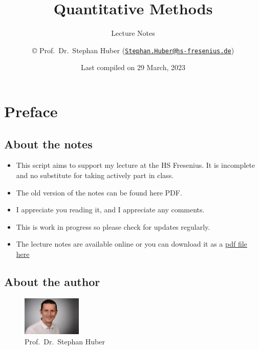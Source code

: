 \documentclass[
  12pt,
  oneside]{book}
\title{Quantitative Methods}
\subtitle{Lecture Notes}
\author{© Prof.~Dr.~Stephan Huber (\href{mailto:Stephan.Huber@hs-fresenius.de}{\nolinkurl{Stephan.Huber@hs-fresenius.de}})}
\date{Last compiled on 29 March, 2023}
\providecommand{\tightlist}{%
  \setlength{\itemsep}{0pt}\setlength{\parskip}{0pt}}
\theoremstyle{definition}
\theoremstyle{definition}
\theoremstyle{definition}
\theoremstyle{definition}
\theoremstyle{remark}
\begin{document}
\maketitle

{
\hypersetup{linkcolor=}
\setcounter{tocdepth}{2}
\tableofcontents
}
\hypertarget{preface}{%
\chapter*{Preface}\label{preface}}

\hypertarget{about-the-notes}{%
\section*{About the notes}\label{about-the-notes}}

\begin{itemize}
\tightlist
\item
  This script aims to support my lecture at the HS Fresenius. It is incomplete and no substitute for taking actively part in class.
\item
  The old version of the notes can be found here PDF.
\item
  I appreciate you reading it, and I appreciate any comments.
\item
  This is work in progress so please check for updates regularly.
\item
  The lecture notes are available online or you can download it as a \href{https://raw.githubusercontent.com/hubchev/hubchev.github.io/main/qm/_main.pdf}{pdf file here}
\end{itemize}

\hypertarget{about-the-author}{%
\section*{About the author}\label{about-the-author}}

\begin{figure}
\centering
\includegraphics[width=0.25\textwidth,height=\textheight]{fig/huber2.jpeg}
\caption[\label{fig:itsme} Prof.~Dr.~Stephan Huber]{\label{fig:itsme} Prof.~Dr.~Stephan Huber\footnotemark{}}
\end{figure}
\end{document}
